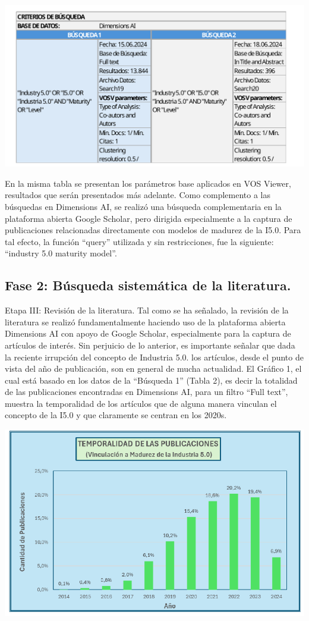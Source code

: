 \documentclass{article}
\begin{document}
\includegraphics{images/clipboard-3901526380.png}

En la misma tabla se presentan los parámetros base aplicados en VOS
Viewer, resultados que serán presentados más adelante. Como complemento
a las búsquedas en Dimensions AI, se realizó una búsqueda complementaria
en la plataforma abierta Google Scholar, pero dirigida especialmente a
la captura de publicaciones relacionadas directamente con modelos de
madurez de la I5.0. Para tal efecto, la función ``query'' utilizada y
sin restricciones, fue la siguiente: ``industry 5.0 maturity model''.

\subsection{Fase 2: Búsqueda sistemática de la
literatura.}\label{fase-2-buxfasqueda-sistemuxe1tica-de-la-literatura.}

Etapa III: Revisión de la literatura. Tal como se ha señalado, la
revisión de la literatura se realizó fundamentalmente haciendo uso de la
plataforma abierta Dimensions AI con apoyo de Google Scholar,
especialmente para la captura de artículos de interés. Sin perjuicio de
lo anterior, es importante señalar que dada la reciente irrupción del
concepto de Industria 5.0. los artículos, desde el punto de vista del
año de publicación, son en general de mucha actualidad. El Gráfico 1, el
cual está basado en los datos de la ``Búsqueda 1'' (Tabla 2), es decir
la totalidad de las publicaciones encontradas en Dimensions AI, para un
filtro ``Full text'', muestra la temporalidad de los artículos que de
alguna manera vinculan el concepto de la I5.0 y que claramente se
centran en los 2020s.

\includegraphics{images/clipboard-1073881894.png}
\end{document}
